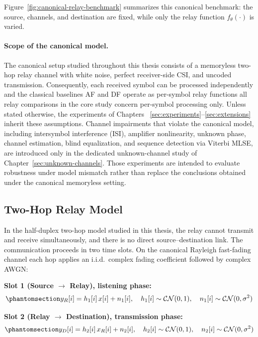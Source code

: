 Figure~\ref{fig:canonical-relay-benchmark} summarizes this canonical benchmark: the source, channels, and destination are fixed, while only the relay function $f_\theta(\cdot)$ is varied.


\paragraph{Scope of the canonical model.} The canonical setup studied throughout this thesis consists of a memoryless two-hop relay channel with white noise, perfect receiver-side CSI, and uncoded transmission. Consequently, each received symbol can be processed independently and the classical baselines AF and DF operate as per-symbol relay functions all relay comparisons in the core study concern per-symbol processing only. Unless stated otherwise, the experiments of Chapters~ \ref{sec:experiments}--\ref{sec:extensions} inherit these assumptions. Channel impairments that violate the canonical model, including intersymbol interference (ISI), amplifier nonlinearity, unknown phase, channel estimation, blind equalization, and sequence detection via Viterbi MLSE, are introduced only in the dedicated unknown-channel study of Chapter~\ref{sec:unknown-channels}. Those experiments are intended to evaluate robustness under model mismatch rather than replace the conclusions obtained under the canonical memoryless setting.

\subsection{Two-Hop Relay Model}\label{sec:two-hop-relay-model}

In the half-duplex two-hop model studied in this thesis, the relay cannot transmit and receive simultaneously, and there is no direct source--destination link. The communication proceeds in two time slots. On the canonical Rayleigh fast-fading channel each hop applies an i.i.d.\ complex fading coefficient followed by complex AWGN:

\textbf{Slot 1 (Source $\to$ Relay), listening phase:} \begin{equation}\protect\phantomsection\label{eq:rayleigh-hop1}{y_R[i] = h_1[i]\,x[i] + n_1[i], \quad h_1[i] \sim \mathcal{CN}(0, 1), \quad n_1[i] \sim \mathcal{CN}(0, \sigma^2)
}\end{equation}

\textbf{Slot 2 (Relay $\to$ Destination), transmission phase:} \begin{equation}\protect\phantomsection\label{eq:rayleigh-hop2}{y_D[i] = h_2[i]\,x_R[i] + n_2[i], \quad h_2[i] \sim \mathcal{CN}(0, 1), \quad n_2[i] \sim \mathcal{CN}(0, \sigma^2)
}\end{equation}

